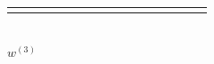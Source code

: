 \documentclass[12pt]{article}
\def\red{\textcolor{red}}
\numberwithin{equation}{section}
\def\red{\textcolor{red}}
\theoremstyle{plain}
\def\green{\textcolor{blue}}
\begin{document}
\begin{table}[h]
\begin{minipage}{0.45\textwidth}
\begin{tabular}{c|ccccccccccccccc}
			& \makebox[0.7em][r]{$_{\green{7}}\red{3}$}
			& \makebox[0.7em][r]{$_{\green{8}}2$} 
			& \makebox[0.7em][r]{$_{\green{9}}2$} 
			& \makebox[0.7em][r]{$_{\green{6}}\red{4}$} 
			& \makebox[0.7em][r]{$_{\green{5}}\red{5}$} 
			& \makebox[0.7em][r]{$_{\green{4}}\red{5}$} 
			& \makebox[0.7em][r]{$_{\green{3}}\red{5}$} 
			& \makebox[0.7em][r]{$_{\green{10}}1$} 
			& \makebox[0.7em][r]{$_{\green{2}}4$} 
			& \makebox[0.7em][r]{$_{\green{1}}3$}
			& \makebox[0.7em][r]{$_{\green{0}}1$}
			& \makebox[0.7em][r]{$_*2$} 
			& \makebox[0.7em][r]{$_*1$}
			& \makebox[0em][r]{$_*$} \\
		\end{tabular}
		\\[0.5em] %
		{\small $w^{(3)}$} %
	\end{minipage}
\end{table}
\end{document}
